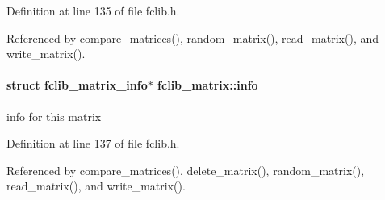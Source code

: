 Definition at line 135 of file fclib.\+h.



Referenced by compare\+\_\+matrices(), random\+\_\+matrix(), read\+\_\+matrix(), and write\+\_\+matrix().

\hypertarget{structfclib__matrix_ac0af227334c5b0a13a3222c8f04add36}{}
\paragraph[{info}]{\setlength{\rightskip}{0pt plus 5cm}struct {\bf fclib\+\_\+matrix\+\_\+info}$\ast$ fclib\+\_\+matrix\+::info}\label{structfclib__matrix_ac0af227334c5b0a13a3222c8f04add36}


info for this matrix 



Definition at line 137 of file fclib.\+h.



Referenced by compare\+\_\+matrices(), delete\+\_\+matrix(), random\+\_\+matrix(), read\+\_\+matrix(), and write\+\_\+matrix().

